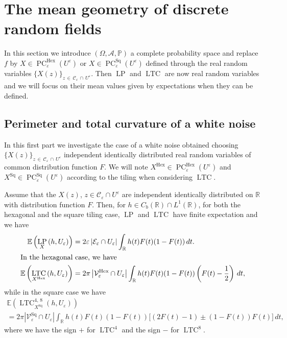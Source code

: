 \documentclass[AHL,Unicode,longabstracts,published]{cedram}
\newcommand{\R}{\mathbb{R}}
\newcommand{\bbP}{\mathbb{P}}
\newcommand{\E}{\mathbb{E}}
\newcommand{\eps}{\varepsilon}
\DeclareMathOperator{\LTC}{LTC}
\DeclareMathOperator{\LP}{LP}
\DeclareMathOperator{\PC}{PC}
\DeclareMathOperator{\Hex}{Hex}
\DeclareMathOperator{\Sq}{Sq}
\newcommand{\calC}{\mathcal{C}}
\newcommand{\calV}{\mathcal{V}}
\newcommand{\calE}{\mathcal{E}}
\newcommand{\calA}{\mathcal{A}}
\begin{document}
\section{The mean geometry of discrete random fields}\label{MGoDRM:sec}
In this section we introduce $(\Omega, {\calA},\bbP)$ a complete probability space and replace $f$ by $X\in\PC^{\Hex}_\eps(U^{\eps})$ or $X\in\PC^{\Sq}_\eps(U^{\eps})$ defined through the real random variables $\{X(z)\}_{z\,\in\,\calC_\eps\,\cap\,U^{\eps}}$. Then $\LP$ and $\LTC$ are now real random variables and we will focus on their mean values given by expectations when they can be defined.

\subsection{Perimeter and total curvature of a white noise}
In this first part we investigate the case of a white noise obtained choosing $\{X(z)\}_{z\,\in\,\calC_\eps\,\cap\,U^{\eps}}$ independent identically distributed real random variables of common distribution function $F$. We will note $X^{\Hex}\in\PC^{\Hex}_\eps(U^{\eps})$ and $X^{\Sq}\in\PC^{\Sq}_\eps(U^{\eps})$ according to the tiling when considering $\LTC$.
\pagebreak
\begin{prop}
Assume that the $X(z)$, $z\in\calC_\eps\cap U^{\eps}$ are independent identically distributed on $\R$ with distribution function $F$. Then, for $h\in C_b(\R)\cap L^1(\R)$, for both the hexagonal and the square tiling case, $\LP$ and $\LTC$ have finite expectation and we have
\begin{align*}
\E\left(\LP_X\left(h,U_\eps\right)\right) &= 2\eps \left|\calE_\eps\cap U_\eps\right| \int_\R h(t) F(t) (1-
F(t)) \, dt.
\\
\intertext{In the hexagonal case, we have}
\E\left(\LTC_{X^{\Hex}}\left(h,U_\eps\right)\right) &= 2\pi \left|\calV_\eps^{\Hex}\cap U_\eps\right| \int_\R h(t) F(t) (1- F(t)) \left(F(t) -
\frac{1}{2}\right) \,dt,
\end{align*}
while in the square case we have
\begin{multline*}
\E\left(\LTC_{{X^{\Sq}}}^{4,\,8}(h,U_\eps)\right) \\
= 2\pi \left|\calV_\eps^{\Sq}\cap U_\eps\right| \int_\R h(t) F(t)
(1- F(t)) \big[(2F(t) - 1) \pm (1-F(t))F(t)\big] \,dt,
\end{multline*}
where we have the sign $+$ for $\LTC^4$ and the sign $-$ for $\LTC^8$.
\end{prop}
\end{document}
